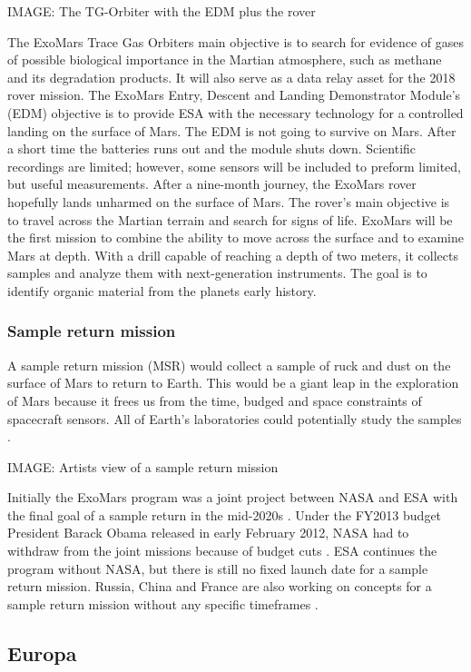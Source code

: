 IMAGE: The TG-Orbiter with the EDM plus the rover

The ExoMars Trace Gas Orbiters main objective is to search for evidence of gases of possible biological importance in the Martian atmosphere, such as methane and its degradation products.
It will also serve as a data relay asset for the 2018 rover mission.
The ExoMars Entry, Descent and Landing Demonstrator Module’s (EDM) objective is to provide ESA with the necessary technology for a controlled landing on the surface of Mars.
The EDM is not going to survive on Mars.
After a short time the batteries runs out and the module shuts down.
Scientific recordings are limited; however, some sensors will be included to preform limited, but useful measurements.
After a nine-month journey, the ExoMars rover hopefully lands unharmed on the surface of Mars.
The rover’s main objective is to travel across the Martian terrain and search for signs of life.
ExoMars will be the first mission to combine the ability to move across the surface and to examine Mars at depth.
With a drill capable of reaching a depth of two meters, it collects samples and analyze them with next-generation instruments.
The goal is to identify organic material from the planets early history.

\subsubsection*{Sample return mission}

A sample return mission (MSR) would collect a sample of ruck and dust on the surface of Mars to return to Earth.
This would be a giant leap in the exploration of Mars because it frees us from the time, budged and space constraints of spacecraft sensors.
All of Earth’s laboratories could potentially study the samples \cite{FPlan15}.
 
IMAGE: Artists view of a sample return mission

Initially the ExoMars program was a joint project between NASA and ESA with the final goal of a sample return in the mid-2020s \cite{FPlan15}.
Under the FY2013 budget President Barack Obama released in early February 2012, NASA had to withdraw from the joint missions because of budget cuts \cite{FPlan16}.
ESA continues the program without NASA, but there is still no fixed launch date for a sample return mission.
Russia, China and France are also working on concepts for a sample return mission without any specific timeframes \cite{FPlan15}.

\subsection*{Europa}
 
